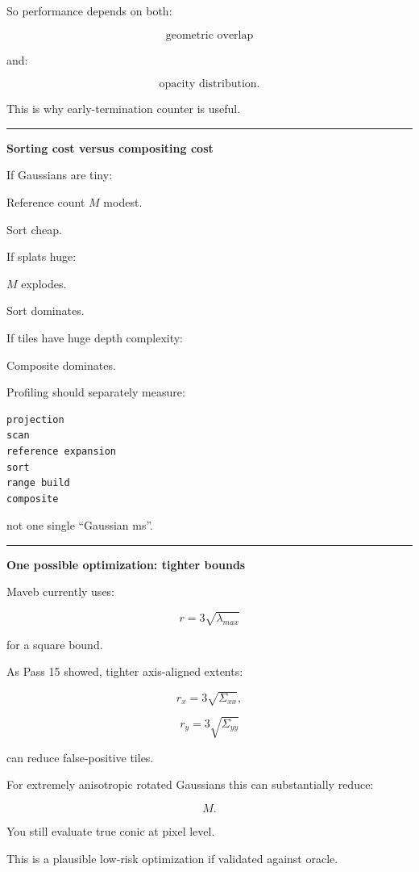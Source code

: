 So performance depends on both:

\[
\boxed{
\text{geometric overlap}
}
\]

and:

\[
\boxed{
\text{opacity distribution}.
}
\]

This is why early-termination counter is useful.

\begin{center}\rule{0.5\linewidth}{0.5pt}\end{center}

\textbf{Sorting cost versus compositing cost}

If Gaussians are tiny:

Reference count \(M\) modest.

Sort cheap.

If splats huge:

\(M\) explodes.

Sort dominates.

If tiles have huge depth complexity:

Composite dominates.

Profiling should separately measure:

\protect{}\label{8f90ti}%
\begin{verbatim}
projection
scan
reference expansion
sort
range build
composite
\end{verbatim}

not one single ``Gaussian ms''.

\begin{center}\rule{0.5\linewidth}{0.5pt}\end{center}

\textbf{One possible optimization: tighter bounds}

Maveb currently uses:

\[
r=
3\sqrt{\lambda_{max}}
\]

for a square bound.

As Pass 15 showed, tighter axis-aligned extents:

\[
r_x=
3\sqrt{\Sigma_{xx}},
\]

\[
r_y=
3\sqrt{\Sigma_{yy}}
\]

can reduce false-positive tiles.

For extremely anisotropic rotated Gaussians this can substantially reduce:

\[
M.
\]

You still evaluate true conic at pixel level.

This is a plausible low-risk optimization if validated against oracle.

